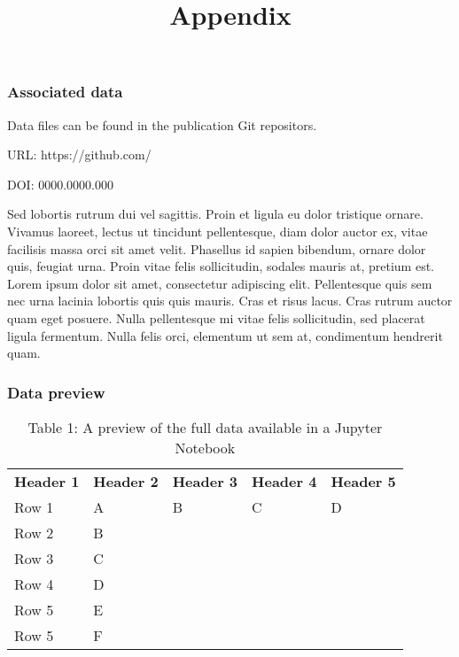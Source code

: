 \documentclass{article}
\begin{document}
\title{Appendix}

\maketitle


\subsubsection{Associated data}\label{H2118760}



Data files can be found in the publication Git repositors.


URL: https://github.com/


DOI: 0000.0000.000


Sed lobortis rutrum dui vel sagittis. Proin et ligula eu dolor tristique ornare. Vivamus laoreet, lectus ut tincidunt pellentesque, diam dolor auctor ex, vitae facilisis massa orci sit amet velit. Phasellus id sapien bibendum, ornare dolor quis, feugiat urna. Proin vitae felis sollicitudin, sodales mauris at, pretium est. Lorem ipsum dolor sit amet, consectetur adipiscing elit. Pellentesque quis sem nec urna lacinia lobortis quis quis mauris. Cras et risus lacus. Cras rutrum auctor quam eget posuere. Nulla pellentesque mi vitae felis sollicitudin, sed placerat ligula fermentum. Nulla felis orci, elementum ut sem at, condimentum hendrerit quam.


\subsubsection{Data preview}\label{H298432}



\begin{center}
\begin{table}
\caption*{Table 1: A preview of the full data available in a Jupyter Notebook}\label{T38376431}

\begin{tabu} to 0.75\textwidth { |X|X|X|X|X| }
\hline



\textbf{Header 1} & \textbf{Header 2} & \textbf{Header 3} & \textbf{Header 4} & \textbf{Header 5}
 \\


Row 1 & A & B & C & D
 \\


Row 2 & B &  &  & 
 \\


Row 3 & C &  &  & 
 \\


Row 4 & D &  &  & 
 \\


Row 5 & E &  &  & 
 \\


Row 5 & F &  &  & 
 \\
\hline

\end{tabu}\end{table}


\end{center}
\end{document}
